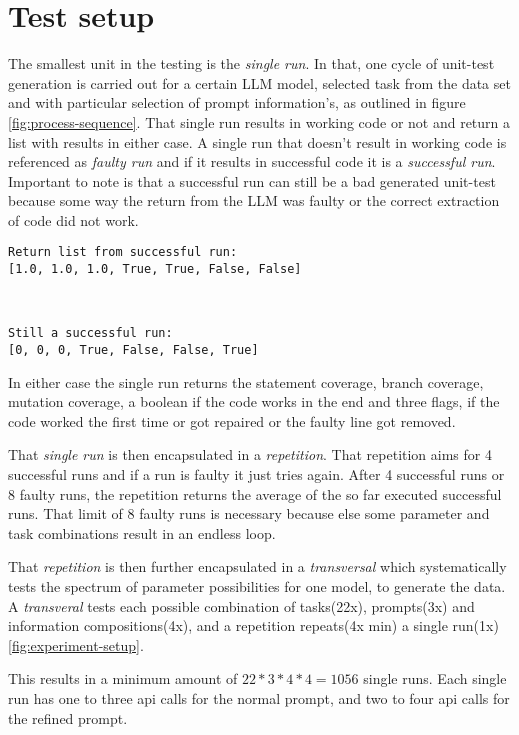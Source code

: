 \documentclass[a4paper,11pt,oneside]{memoir}
\begin{document}
\section{Test setup}
\label{testSetup}
The smallest unit in the testing is the \textit{single run}. In that, one cycle of unit-test generation is carried out for a certain LLM model, selected task from the data set and with particular selection of prompt information's, as outlined in figure \ref{fig:process-sequence}.
That single run results in working code or not and return a list with results in either case. A single run that doesn't result in working code is referenced as \textit{faulty run} and if it results in successful code it is a \textit{successful run}. 
Important to note is that a successful run can still be a bad generated unit-test because some way the return from the LLM was faulty or the correct extraction of code did not work.  

\begin{verbatim}
Return list from successful run:
[1.0, 1.0, 1.0, True, True, False, False]
\end{verbatim}\\
\begin{verbatim}
Still a successful run:
[0, 0, 0, True, False, False, True]
\end{verbatim}
\label{verbatim:returnFromRun}

In either case the single run returns the statement coverage, branch coverage, mutation coverage, a boolean if the code works in the end and three flags, if the code worked the first time or got repaired or the faulty line got removed.

That \textit{single run} is then encapsulated in a \textit{repetition}. That repetition aims for 4 successful runs and if a run is faulty it just tries again. After 4 successful runs or 8 faulty runs, the repetition returns the average of the so far executed successful runs. That limit of 8 faulty runs is necessary because else some parameter and task combinations result in an endless loop.

That \textit{repetition} is then further encapsulated in a \textit{transversal} which systematically tests the spectrum of parameter possibilities for one model, to generate the data. A \textit{transveral} tests each possible combination of tasks(22x), prompts(3x) and information compositions(4x), and  a repetition repeats(4x min) a single run(1x)\ref{fig:experiment-setup}.

This results in a minimum amount of $22*3*4*4=1056$ single runs. Each single run has one to three api calls for the normal prompt, and two to four api calls for the refined prompt. 
\end{document}
